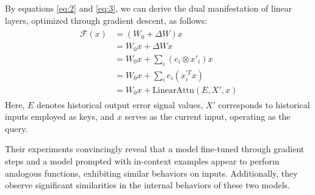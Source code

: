 \documentclass[runningheads]{llncs}
\begin{document}
By equations \eqref{eq:2} and \eqref{eq:3}, we can derive the dual manifestation of linear layers, optimized through gradient descent, as follows:
\begin{align}
  \begin{split}
    \mathcal{F}(x) &= (W_0 + \Delta W)x \\
    &= W_0x + \Delta Wx \\
    &= W_0x + \sum_{i} (e_i \otimes x'_i)x \\
    &= W_0x + \sum_{i} e_i(x^{'T}_ix) \\
    &= W_0x + \text{LinearAttn}(E, X', x)
  \end{split}
  \label{eq:4}
\end{align}
Here, $E$ denotes historical output error signal values, $X'$ corresponds to historical inputs employed as keys, and $x$ serves as the current input, operating as the query.

Their experiments convincingly reveal that a model fine-tuned through gradient steps and a model prompted with in-context examples appear to perform analogous functions, exhibiting similar behaviors on inputs. 
Additionally, they observe significant similarities in the internal behaviors of these two models.


 
 
\end{document}
